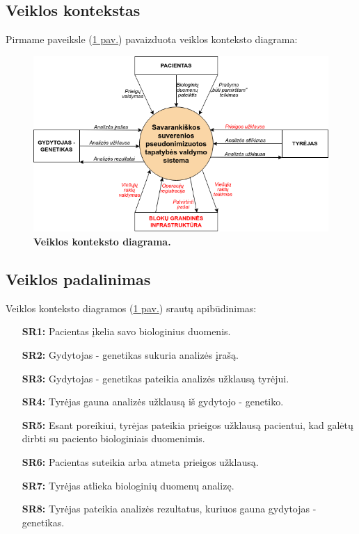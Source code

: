 \documentclass[12pt]{article}
\begin{document}
\subsection{Veiklos kontekstas}
Pirmame paveiksle (\hyperref[fig:context]{1 pav.}) pavaizduota veiklos
konteksto diagrama:

\begin{figure}[ht]
    \begin{center}
        \captionsetup{justification=centering}
        \includegraphics[width=1.0\linewidth]{Konteksto_diagrama.png}
        \vspace{-1\baselineskip}
        \caption{\small\textbf{Veiklos konteksto diagrama.}}
        \label{fig:context}
    \end{center}
\end{figure}

\subsection{Veiklos padalinimas}
Veiklos konteksto diagramos (\hyperref[fig:context]{1 pav.}) srautų
apibūdinimas:

\begin{enumerate}[itemsep=0.5pt]
    \item[\textbf{SR1:}] Pacientas įkelia savo biologinius duomenis.
    \item[\textbf{SR2:}] Gydytojas - genetikas sukuria analizės įrašą.
    \item[\textbf{SR3:}] Gydytojas - genetikas pateikia analizės užklausą
    tyrėjui.
    \item[\textbf{SR4:}] Tyrėjas gauna analizės užklausą iš gydytojo - genetiko.
    \item[\textbf{SR5:}] Esant poreikiui, tyrėjas pateikia prieigos užklausą
    pacientui, kad galėtų dirbti su paciento biologiniais duomenimis.
    \item[\textbf{SR6:}] Pacientas suteikia arba atmeta prieigos užklausą.
    \item[\textbf{SR7:}] Tyrėjas atlieka biologinių duomenų analizę.
    \item[\textbf{SR8:}] Tyrėjas pateikia analizės rezultatus, kuriuos gauna
    gydytojas - genetikas.
\end{enumerate}
\end{document}
